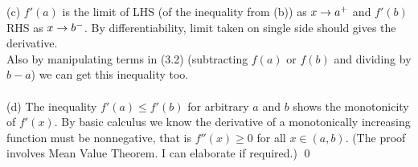 \documentclass[12pt,a4paper]{article}
\newcommand{\ra}[1]{\ifnum #1=1\rightarrow\fi\ifnum #1=2\Rightarrow\fi\ifnum #1=3\Rrightarrow\fi\ifnum #1=4\rightrightarrows\fi\ifnum #1=5\rightleftarrows\fi\ifnum #1=6\mapsto\fi\ifnum #1=7\fi\ifnum #1=8\twoheadrightarrow\fi\ifnum #1=9\rightharpoonup\fi\ifnum #1=0\rightharpoondown\fi}
\begin{document}
(c) $f'(a)$ is the limit of LHS (of the inequality from (b)) as $x\ra1 a^+$ and $f'(b)$ RHS as $x\ra1 b^-$. By differentiability, limit taken on single side should gives the derivative. \\
Also by manipulating terms in (3.2) (subtracting $f(a)$ or $f(b)$ and dividing by $b-a$) we can get this inequality too. \\
\\
(d) The inequality $f'(a) \leq f'(b)$ for arbitrary $a$ and $b$ shows the monotonicity of $f'(x)$. By basic calculus we know the derivative of a monotonically increasing function must be nonnegative, that is $f''(x) \geq 0$ for all $x\in(a, b)$. (The proof involves Mean Value Theorem. I can elaborate if required.) \qed
\end{document}

